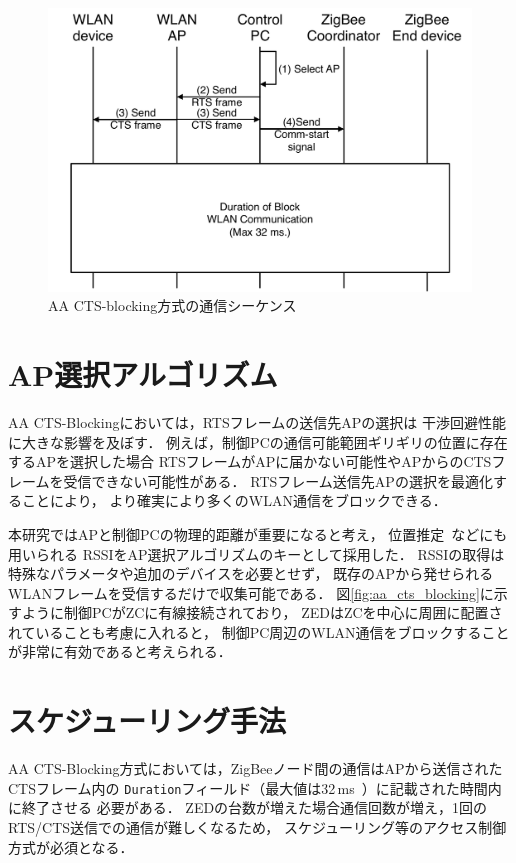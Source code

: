 \documentclass[12pt]{jreport}
\begin{document}
\begin{figure}[bt]
 \centering
 \includegraphics[width=\columnwidth]{figure/sequence.pdf}
 \caption{AA CTS-blocking方式の通信シーケンス}
 \label{fig:sequence}
\end{figure}

\section{AP選択アルゴリズム}
\label{ssec:select_ap}

AA CTS-Blockingにおいては，RTSフレームの送信先APの選択は
干渉回避性能に大きな影響を及ぼす．
例えば，制御PCの通信可能範囲ギリギリの位置に存在するAPを選択した場合
RTSフレームがAPに届かない可能性やAPからのCTSフレームを受信できない可能性がある．
RTSフレーム送信先APの選択を最適化することにより，
より確実により多くのWLAN通信をブロックできる．

本研究ではAPと制御PCの物理的距離が重要になると考え，
位置推定~\cite{izumi13:awpn_acc_imprv}などにも用いられる
RSSIをAP選択アルゴリズムのキーとして採用した．
RSSIの取得は特殊なパラメータや追加のデバイスを必要とせず，
既存のAPから発せられるWLANフレームを受信するだけで収集可能である．
図\ref{fig:aa_cts_blocking}に示すように制御PCがZCに有線接続されており，
ZEDはZCを中心に周囲に配置されていることも考慮に入れると，
制御PC周辺のWLAN通信をブロックすることが非常に有効であると考えられる．

\section{スケジューリング手法}
\label{sec:design}

AA CTS-Blocking方式においては，ZigBeeノード間の通信はAPから送信されたCTSフレーム内の
\texttt{Duration}フィールド（最大値は32\,ms~\cite{IEEE802_11-2007}）に記載された時間内に終了させる
必要がある．
ZEDの台数が増えた場合通信回数が増え，1回のRTS/CTS送信での通信が難しくなるため，
スケジューリング等のアクセス制御方式が必須となる．
\end{document}
